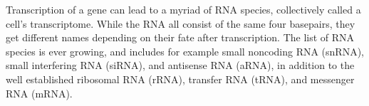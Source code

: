 %
Transcription of a gene can lead to a myriad of RNA species, collectively
called a cell's transcriptome. While the RNA all consist of the same four
basepairs, they get different names depending on their fate after
transcription. The list of RNA species is ever growing, and includes for
example small noncoding RNA (snRNA), small interfering RNA (siRNA), and
antisense RNA (aRNA), in addition to the well established ribosomal RNA (rRNA),
transfer RNA (tRNA), and messenger RNA (mRNA).
